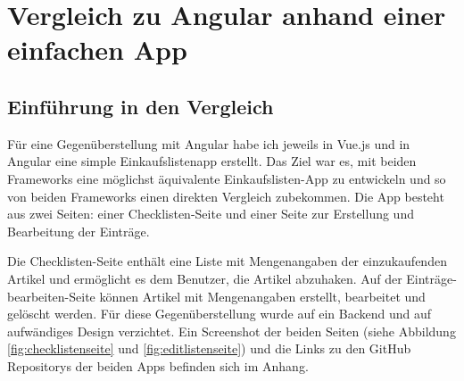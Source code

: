 

\chapter{Vergleich zu Angular anhand einer einfachen App}\label{ch:vergleich-zu-angular-anhand-einer-einfachen-app}


\section{Einführung in den Vergleich}
Für eine Gegenüberstellung mit Angular habe ich jeweils in Vue.js und in Angular eine
simple Einkaufslistenapp erstellt.
Das Ziel war es, mit beiden Frameworks eine möglichst äquivalente Einkaufslisten-App zu entwickeln und
so von beiden Frameworks einen direkten Vergleich zubekommen.
Die App besteht aus zwei Seiten: einer Checklisten-Seite und einer Seite zur Erstellung und Bearbeitung der Einträge.

Die Checklisten-Seite enthält eine Liste mit Mengenangaben der einzukaufenden Artikel und ermöglicht es dem Benutzer, die Artikel abzuhaken.
Auf der Einträge-bearbeiten-Seite können Artikel mit Mengenangaben erstellt, bearbeitet und gelöscht werden.
Für diese Gegenüberstellung wurde auf ein Backend und auf aufwändiges Design verzichtet.
Ein Screenshot der beiden Seiten (siehe Abbildung \ref{fig:checklistenseite} und \ref{fig:editlistenseite}) und die Links zu den GitHub Repositorys der beiden Apps befinden sich im Anhang.


